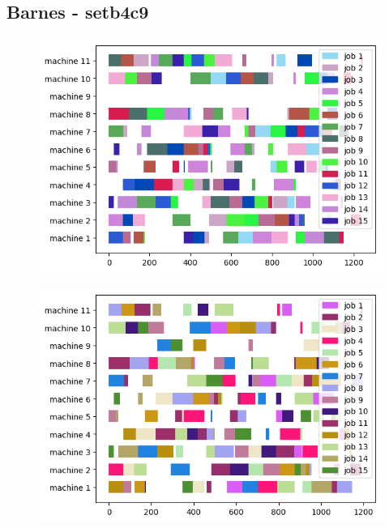 \subsection{Barnes - setb4c9}

\begin{figure}[!h]
    \centering
    \includegraphics[]{results/barnes_setb4c9_shortest_operation.png}
\end{figure}

\begin{figure}[!h]
    \centering
    \includegraphics[]{results/barnes_setb4c9_genetic.png}
\end{figure}

